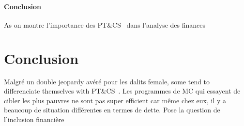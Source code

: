 \documentclass[a4paper, 11pt, onecolumn]{article}
\newcommand{\PTCS}{PT\&CS}
\begin{document}
\paragraph{Conclusion}
As \cite{Brown2014} on montre l'importance des \PTCS~ dans l'analyse des finances


\section{Conclusion}
\label{Conclusion}

Malgré un double jeopardy avéré pour les dalits female, some tend to differenciate themselves with \PTCS~.
Les programmes de MC qui essayent de cibler les plus pauvres ne sont pas super efficient car même chez eux, il y a beaucoup de situation différentes en termes de dette.
Pose la question de l'inclusion financière


\clearpage
\newpage
%




\newpage
\appendix
{}







\end{document}
